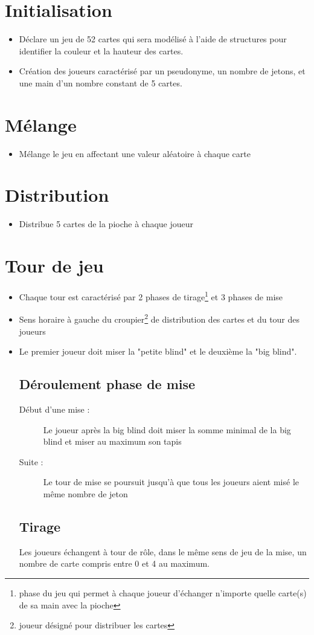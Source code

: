 \documentclass[12pt,a4paper]{article}
\begin{document}
\section{Initialisation}
\renewcommand\labelitemi{$\bullet$}
\begin{itemize}
\item{
Déclare un jeu de 52 cartes qui sera modélisé à l'aide de structures pour identifier la couleur et la hauteur des cartes.}
\item{Création des joueurs caractérisé par un pseudonyme, un nombre de jetons, et une main d'un nombre constant de 5 cartes.}
\end{itemize}

\section{Mélange}
\begin{itemize}
\item{
Mélange le jeu en affectant une valeur aléatoire à chaque carte }
\end{itemize}

\section{Distribution}
\begin{itemize}
\item{
Distribue 5 cartes de la pioche à chaque joueur}
\end{itemize}

\section{Tour de jeu}
\begin{itemize}
\item{Chaque tour est caractérisé par 2 phases de tirage\footnote{phase du jeu qui permet à chaque joueur d'échanger n'importe quelle carte(s) de sa main avec la pioche} et 3 phases de mise}
\item{Sens horaire à gauche du croupier\footnote{joueur désigné pour distribuer les cartes} de distribution des cartes et du tour des joueurs }
\item{Le premier joueur doit miser la "petite blind" et le deuxième la "big blind".}
\subsection{ Déroulement phase de mise}
\begin{description}
\item[Début d'une mise : ]{Le joueur après la big blind doit miser la somme minimal  de la big blind et miser au maximum son tapis }
\item[Suite : ]{Le tour de mise se poursuit jusqu'à que tous les joueurs aient misé le même nombre de jeton}
\end{description}
\subsection{Tirage}
Les joueurs échangent à tour de rôle, dans le même sens de jeu de la mise, un nombre de carte compris entre 0 et 4 au maximum.
\end{itemize}
\end{document}
